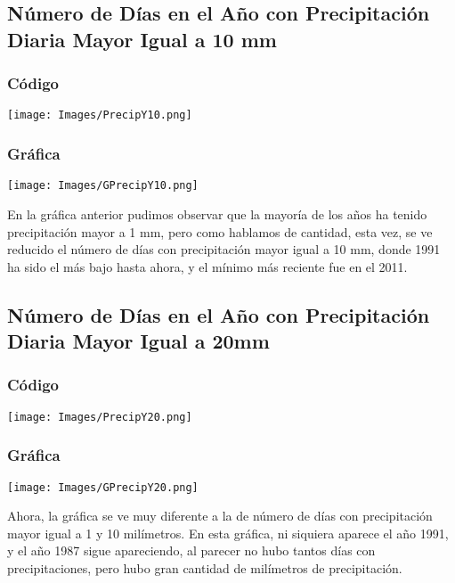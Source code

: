 \documentclass{article}
\begin{document}
\subsection{Número de Días en el Año con Precipitación Diaria Mayor Igual a 10 mm}
\subsubsection{Código}
\begin{center}
    \texttt{[image: Images/PrecipY10.png]}
\end{center}

\subsubsection{Gráfica}
\begin{center}
    \texttt{[image: Images/GPrecipY10.png]}
\end{center}
En la gráfica anterior pudimos observar que la mayoría de los años ha tenido precipitación mayor a 1 mm, pero como hablamos de cantidad, esta vez, se ve reducido el número de días con precipitación mayor igual a 10 mm, donde 1991 ha sido el más bajo hasta ahora, y el mínimo más reciente fue en el 2011.

\subsection{Número de Días en el Año con Precipitación Diaria Mayor Igual a 20mm}
\subsubsection{Código}
\begin{center}
    \texttt{[image: Images/PrecipY20.png]}
\end{center}
\subsubsection{Gráfica}
\begin{center}
    \texttt{[image: Images/GPrecipY20.png]}
\end{center}
Ahora, la gráfica se ve muy diferente a la de número de días con precipitación mayor igual a 1 y 10 milímetros. En esta gráfica, ni siquiera aparece el año 1991, y el año 1987 sigue apareciendo, al parecer no hubo tantos días con precipitaciones, pero hubo gran cantidad de milímetros de precipitación.
\end{document}
